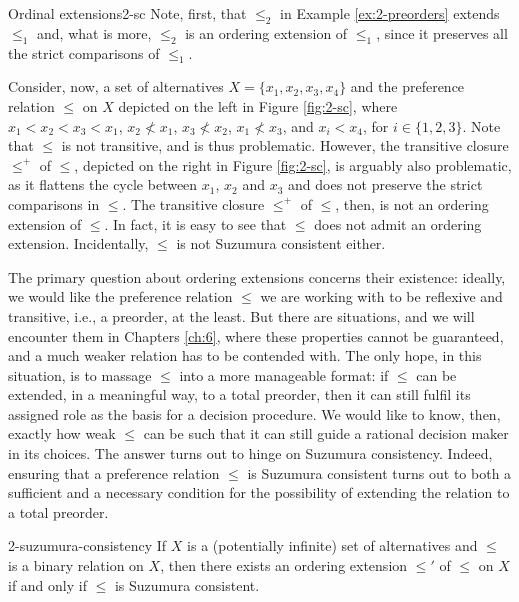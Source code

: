 \begin{xmpl}{Ordinal extensions}{2-sc}
	Note, first, that $\le_2$ in Example \ref{ex:2-preorders} extends $\le_1$
	and, what is more, $\le_2$ is an ordering extension of $\le_1$,
	since it preserves all the strict comparisons of $\le_1$.

	Consider, now, a set of alternatives $X=\{x_1,x_2,x_3,x_4\}$
	and the preference relation $\le$ on $X$ depicted 
	on the left in Figure \ref{fig:2-sc},
	where $x_1<x_2<x_3<x_1$, 
	$x_2\not<x_1$, $x_3\not< x_2$, $x_1\not< x_3$, and
	$x_i<x_4$, for $i\in\{1,2,3\}$.
	Note that $\le$ is not transitive, and is thus problematic.
	However, the transitive closure $\le^+$ of $\le$,
	depicted on the right in Figure \ref{fig:2-sc},
	is arguably also problematic, as it flattens the 
	cycle between $x_1$, $x_2$ and $x_3$ and does not preserve
	the strict comparisons in $\le$.
	The transitive closure $\le^+$ of $\le$, then,
	is not an ordering extension of $\le$.
	In fact, it is easy to see that $\le$ does not admit an 
	ordering extension.
	Incidentally, $\le$ is not Suzumura consistent either.
\end{xmpl}

The primary question about ordering extensions concerns their existence:
ideally, we would like the preference relation $\le$ we are working with
to be reflexive and transitive, i.e., a preorder, at the least.
But there are situations, and we will encounter
them in Chapters \ref{ch:6},
where these properties cannot be guaranteed,
and a much weaker relation has to be contended 
with. The only hope, in this situation,
is to massage $\le$ into a more manageable format:
if $\le$ can be extended, in a meaningful way, to a total preorder,
then it can still fulfil its assigned role 
as the basis for a decision procedure.
We would like to know, then, exactly how weak
$\le$ can be such that it can still guide
a rational decision maker in its choices.
The answer turns out to hinge on Suzumura consistency.
Indeed, ensuring that a preference relation $\le$ is Suzumura consistent 
turns out to both a sufficient and a necessary condition 
for the possibility of extending
the relation to a total preorder.

\begin{thm}{\cite{Suzumura76}}{2-suzumura-consistency}
	If $X$ is a (potentially infinite) set of alternatives
	and	$\le$ is a binary relation on $X$,
	then there exists an ordering extension $\le'$ of $\le$ on $X$
	if and only if $\le$ is Suzumura consistent.
\end{thm}

